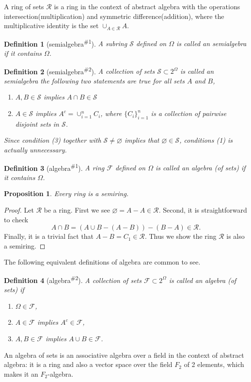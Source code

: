 \documentclass{report}
\newtheorem{definition}{Definition}[section]
\newtheorem{proposition}{Proposition}[section]
\theoremstyle{nonumberplain}
\newtheorem{proof}{Proof.}
\begin{document}
A ring of sets $\mathcal{R}$ is a ring in the context of abstract algebra with the operations intersection(multiplication) and symmetric difference(addition), where the multiplicative identity is the set $\cup_{A\in \mathcal{R}} A$. 

\begin{definition}[semialgebra\textsuperscript{\#1}]
	A subring $\mathcal{S}$ defined on $\Omega$ is called an \emph{semialgebra} if it contains $\Omega$. 
\end{definition}

\begin{definition}[semialgebra\textsuperscript{\#2}]
	A collection of sets $\mathcal{S}\subset 2^{\Omega}$ is called an  \emph{semialgebra} the following two statements are true for all sets $A$ and $B$,
	\begin{enumerate}[(1)]
		\item $A,B\in \mathcal{S}$ implies $A\cap B\in\mathcal{S}$ 
		\item $A\in \mathcal{S}$ implies $A^c=\cup_{i=1}^n C_i$, where $\{C_{i}\}_{i=1}^{n}$ is a collection of pairwise disjoint sets in $\mathcal{S}$.
	\end{enumerate}	
	Since condition (3) together with $\mathcal{S} \neq \varnothing$ implies that $\varnothing \in \mathcal{S}$, conditions (1) is actually unnecessary.
\end{definition}

\begin{definition}[algebra\textsuperscript{\#1}]
	A ring $\mathcal{F}$ defined on $\Omega$ is called an \emph{algebra (of sets)} if it contains $\Omega$. 
\end{definition}

\begin{proposition}
	Every ring is a semiring.
\end{proposition}
\begin{proof}
	Let $\mathcal{R}$ be a ring. First we see $\varnothing=A-A\in \mathcal{R}$. Second, it is straightforward to check
	$$A\cap B=(A\cup B-(A-B))-(B-A)\in\mathcal{R}.$$
	Finally, it is a trivial fact that $A-B=C_1\in\mathcal{R}$. Thus we show the ring $\mathcal{R}$ is also a semiring.
\end{proof}
The following equivalent definitions of algebra are common to see.
\begin{definition}[algebra\textsuperscript{\#2}]
	A collection of sets $\mathcal{F}\subset 2^{\Omega}$ is called an  \emph{algebra (of sets)} if
	\begin{enumerate}
		\item [(a)] $\Omega\in\mathcal{F}$, 
		\item [(b)] $A \in\mathcal{F}$ implies $A^c\in\mathcal{F}$, 
		\item [(c)] $A,B\in\mathcal{F}$ implies $A\cup B\in\mathcal{F}$.
	\end{enumerate}
\end{definition}
An algebra of sets is an associative algebra over a field in the context of abstract algebra: it is a ring and also a vector space over the field $F_2$ of 2 elements, which makes it an $F_2$-algebra. 
\end{document}
